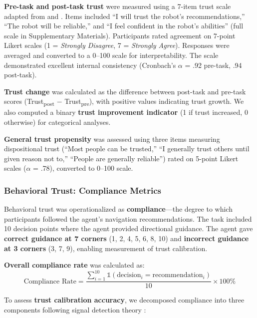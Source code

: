 \documentclass[12pt]{article}
\begin{document}
\textbf{Pre-task and post-task trust} were measured using a 7-item trust scale adapted from \citet{mayer1995integrative} and \citet{schaefer2016meta}. Items included ``I will trust the robot's recommendations,'' ``The robot will be reliable,'' and ``I feel confident in the robot's abilities'' (full scale in Supplementary Materials). Participants rated agreement on 7-point Likert scales (1 = \textit{Strongly Disagree}, 7 = \textit{Strongly Agree}). Responses were averaged and converted to a 0--100 scale for interpretability. The scale demonstrated excellent internal consistency (Cronbach's $\alpha$ = .92 pre-task, .94 post-task).

\textbf{Trust change} was calculated as the difference between post-task and pre-task scores (Trust\textsubscript{post} $-$ Trust\textsubscript{pre}), with positive values indicating trust growth. We also computed a binary \textbf{trust improvement indicator} (1 if trust increased, 0 otherwise) for categorical analyses.

\textbf{General trust propensity} was assessed using three items measuring dispositional trust (``Most people can be trusted,'' ``I generally trust others until given reason not to,'' ``People are generally reliable'') rated on 5-point Likert scales ($\alpha$ = .78), converted to 0--100 scale.

\subsubsection{Behavioral Trust: Compliance Metrics}

Behavioral trust was operationalized as \textbf{compliance}---the degree to which participants followed the agent's navigation recommendations. The task included 10 decision points where the agent provided directional guidance. The agent gave \textbf{correct guidance at 7 corners} (1, 2, 4, 5, 6, 8, 10) and \textbf{incorrect guidance at 3 corners} (3, 7, 9), enabling measurement of trust calibration.

\textbf{Overall compliance rate} was calculated as:
\begin{equation}
\text{Compliance Rate} = \frac{\sum_{i=1}^{10} \mathbb{1}(\text{decision}_i = \text{recommendation}_i)}{10} \times 100\%
\end{equation}

To assess \textbf{trust calibration accuracy}, we decomposed compliance into three components following signal detection theory \citep{parasuraman1997humans}:
\end{document}
